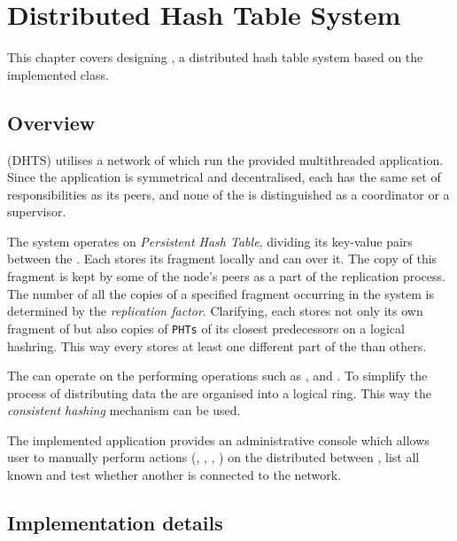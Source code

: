 \chapter{Distributed Hash Table System} \label{Distribution}

This chapter covers designing \DHTS, a distributed hash table system based on the implemented \PHT class.

\section{Overview}

    \DHTS (DHTS) utilises a network of \Nodes which run the provided multithreaded application.
    Since the application is symmetrical and decentralised, each \Node has the same set of responsibilities as its peers, and none of the \Nodes is distinguished as a coordinator or a supervisor.

    The system operates on \textit{Persistent Hash Table}, dividing its key-value pairs between the \Nodes.
    Each \Node stores its \PHT fragment locally and can \iterateMethod over it.
    The copy of this fragment is kept by some of the node's peers as a part of the replication process. 
    The number of all the copies of a specified \PHT fragment occurring in the system is determined by the \textit{replication factor}.
    Clarifying, each \Node stores not only its own fragment of \PHT but also copies of \texttt{PHTs} of its closest predecessors on a logical hashring.
    This way every \Node stores at least one different part of the \PHT than others.

    The \Nodes can operate on the \PHT performing operations such as \insertMethod, \getMethod and \removeMethod.
    To simplify the process of distributing data the \Nodes are organised into a logical ring.
    This way the \textit{consistent hashing} mechanism can be used.
    
    The implemented application provides an administrative console which allows user to manually perform actions (\insertMethod, \getMethod, \removeMethod, \iterateMethod) on the \PHT distributed between \Nodes, list all known \Nodes and test whether another \Node is connected to the network.
    
\section{Implementation details}
